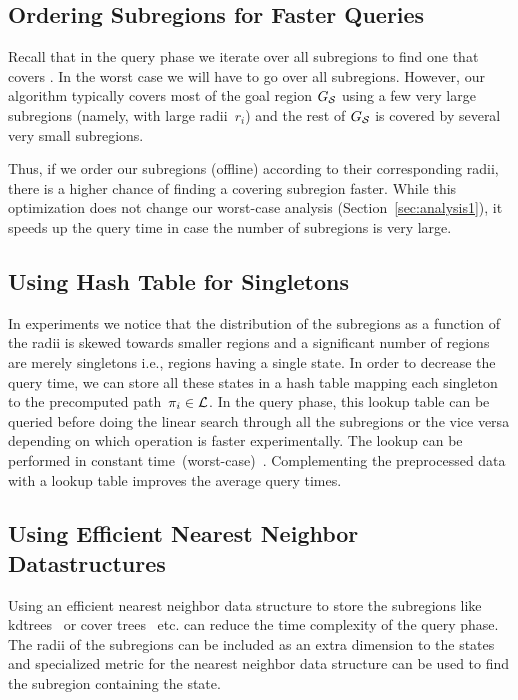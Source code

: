 \documentclass[a4paper]{report}
\begin{document}
\subsection{Ordering Subregions for Faster Queries}
Recall that in the query phase we iterate over all subregions to find one that covers \sGoal. 
In the worst case we will have to go over all subregions.
However, our algorithm typically covers most of the goal region $G_\mathcal{S}$ using a few very large subregions (namely, with large radii~$r_i$) and the rest of $G_\mathcal{S}$ is covered by several very small subregions.

Thus, if we order our subregions (offline) according to their corresponding radii, there is a higher chance of finding a covering subregion faster. While this optimization does not change our worst-case analysis (Section~\ref{sec:analysis1}), it speeds up the query time in case the number of subregions is very large.

\subsection{Using Hash Table for Singletons}
In experiments we notice that the distribution of the subregions as a function of the radii is skewed towards smaller regions and a significant number of regions are merely singletons i.e., regions having a single state. In order to decrease the query time, we can store all these states in a hash table mapping each singleton to the precomputed path~$\pi_i \in \mathcal{L}$.  In the query phase, this lookup table can be queried before doing the linear search through all the subregions or the vice versa depending on which operation is faster experimentally. The lookup can be performed in constant time~(worst-case)~\cite{czech1997perfect}. Complementing the preprocessed data with a lookup table improves the average query times.

\subsection{Using Efficient Nearest Neighbor Datastructures}
Using an efficient nearest neighbor data structure to store the subregions like kdtrees~\cite{bentley1975multidimensional} or cover trees~\cite{beygelzimer2006cover} etc. can reduce the time complexity of the query phase. The radii of the subregions can be included as an extra dimension to the states and specialized metric for the nearest neighbor data structure can be used to find the subregion containing the state.
\end{document}
